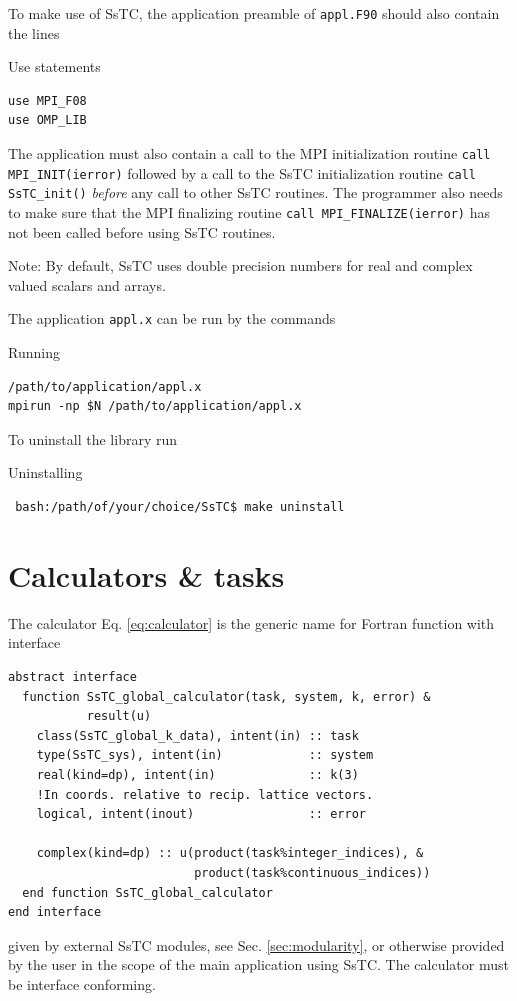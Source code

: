 \documentclass[10pt,a4paper]{article}
\begin{document}
To make use of SsTC, the application preamble of \verb|appl.F90| should also contain the lines
\begin{codebox}{Use statements}
\begin{verbatim}
use MPI_F08
use OMP_LIB
\end{verbatim}
\end{codebox}
The application must also contain a call to the MPI \cite{messagepassinginterfaceforumMPIMessagePassingInterface2021} initialization routine \verb|call MPI_INIT(ierror)| followed by a call to the SsTC initialization routine \verb|call SsTC_init()| \textit{before} any call to other SsTC routines. The programmer also needs to make sure that the MPI finalizing routine \verb|call MPI_FINALIZE(ierror)| has not been called before using SsTC routines.

Note:  By default, SsTC uses double precision numbers for real and complex valued scalars and arrays.

The application \verb|appl.x| can be run by the commands
\begin{codebox}{Running}
\begin{verbatim}
/path/to/application/appl.x
mpirun -np $N /path/to/application/appl.x
\end{verbatim}
\end{codebox}

To uninstall the library run
\begin{codebox}{Uninstalling}
\begin{verbatim}
 bash:/path/of/your/choice/SsTC$ make uninstall
\end{verbatim}
\end{codebox}
\section{Calculators \& tasks}
The calculator Eq. \eqref{eq:calculator} is the generic name for Fortran function with interface
\begin{codebox}{}
\begin{lstlisting}[caption={Interface of a global calculator.},captionpos=b, label={lst:interface_g_calc}]
abstract interface
  function SsTC_global_calculator(task, system, k, error) &
           result(u)
    class(SsTC_global_k_data), intent(in) :: task
    type(SsTC_sys), intent(in)            :: system
    real(kind=dp), intent(in)             :: k(3)
    !In coords. relative to recip. lattice vectors.
    logical, intent(inout)                :: error

    complex(kind=dp) :: u(product(task%integer_indices), &
                          product(task%continuous_indices))
  end function SsTC_global_calculator
end interface
\end{lstlisting}
\end{codebox}
given by external SsTC modules, see Sec. \ref{sec:modularity}, or otherwise provided by the user in the scope of the main application using SsTC. The calculator must be interface conforming.
\end{document}

